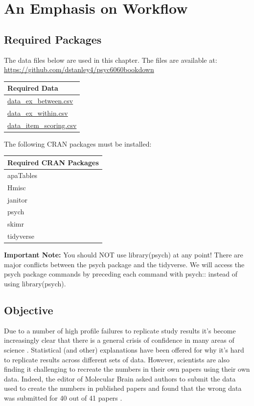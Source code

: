 \documentclass[
]{krantz}
\begin{document}
\hypertarget{an-emphasis-on-workflow}{%
\chapter{An Emphasis on Workflow}\label{an-emphasis-on-workflow}}

\hypertarget{required-packages}{%
\section{Required Packages}\label{required-packages}}

The data files below are used in this chapter. The files are available at: \url{https://github.com/dstanley4/psyc6060bookdown}

\begin{longtable}[]{@{}l@{}}
\toprule
Required Data \\
\midrule
\endhead
\url{data_ex_between.csv} \\
\url{data_ex_within.csv} \\
\url{data_item_scoring.csv} \\
\bottomrule
\end{longtable}

The following CRAN packages must be installed:

\begin{longtable}[]{@{}l@{}}
\toprule
Required CRAN Packages \\
\midrule
\endhead
apaTables \\
Hmisc \\
janitor \\
psych \\
skimr \\
tidyverse \\
\bottomrule
\end{longtable}

\textbf{Important Note:} You should NOT use library(psych) at any point! There are major conflicts between the psych package and the tidyverse. We will access the psych package commands by preceding each command with psych:: instead of using library(psych).

\hypertarget{objective-1}{%
\section{Objective}\label{objective-1}}

Due to a number of high profile failures to replicate study results \citep{cos2015} it's become increasingly clear that there is a general crisis of confidence in many areas of science \citep{baker2016}. Statistical (and other) explanations have been offered \citep{simmons2011} for why it's hard to replicate results across different sets of data. However, scientists are also finding it challenging to recreate the numbers in their own papers using their own data. Indeed, the editor of Molecular Brain asked authors to submit the data used to create the numbers in published papers and found that the wrong data was submitted for 40 out of 41 papers \citep{miyakawa2020}.
\end{document}
